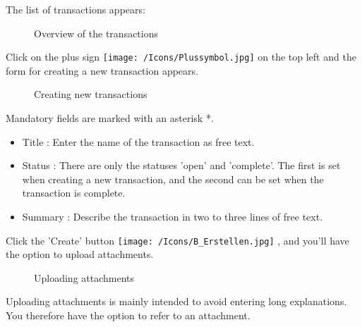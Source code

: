 The list of transactions appears:

\begin{figure}[H]
\caption{Overview of the transactions}
\end{figure}

Click on the plus sign \texttt{[image: /Icons/Plussymbol.jpg]}  on the top left and the form for creating a new transaction appears.

\begin{figure}[H]
\caption{Creating new transactions}
\end{figure}

Mandatory fields are marked with an asterisk *.

\begin{itemize}
\item
Title : Enter the name of the transaction as free text.
\item 
Status : There are only the statuses 'open' and 'complete'. The first is set when creating a new transaction, and the second can be set when the transaction is complete.
\item
Summary : Describe the transaction in two to three lines of free text.
\end{itemize}

Click the 'Create' button \texttt{[image: /Icons/B\_Erstellen.jpg]} , and you'll have the option to upload attachments.

\begin{figure}[H]
\caption{Uploading attachments}
\end{figure}

Uploading attachments is mainly intended to avoid entering long explanations. You therefore have the option to refer to an attachment.

